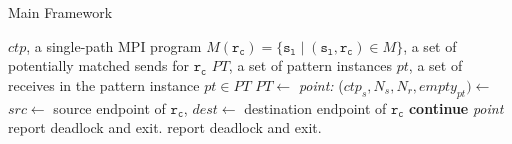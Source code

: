 
\begin{algorithm}
\caption{Main Framework}\label{algo:main}
\begin{algorithmic}[1]
\Require $\mathit{ctp}$, a single-path MPI program
\Require $\mathit{M}(\mathtt{r_c}) = \{\mathtt{s_l}\mid(\mathtt{s_l},\mathtt{r_c})\in\mathit{M}\}$, a set of potentially matched sends for $\mathtt{r_c}$
\State  $\mathit{PT}$, a set of pattern instances
\State  $\mathit{pt}$, a set of receives in the pattern instance $\mathit{pt}\in\mathit{PT}$
\State  $\mathit{PT} \gets$ 
\State \emph{point:}
\State ($\mathit{ctp}_s, \mathit{N_s}, \mathit{N_r}, \mathit{empty}_{pt}) \gets$ 
\State $\mathit{src} \gets$ source endpoint of $\mathtt{r_c}$, $\mathit{dest} \gets$ destination endpoint of $\mathtt{r_c}$
\State \textbf{continue} \textit{point}
\EndIf
\EndFor
\State report deadlock and exit.
\EndIf
{}
\State report deadlock and exit.
\EndIf
\EndIf
\EndIf
\EndFor
\end{algorithmic}
\end{algorithm}


